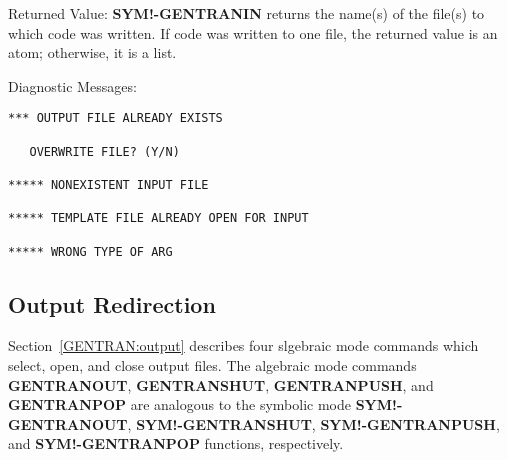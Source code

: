 \begin{describe}{Returned Value:}
{\bf SYM!-GENTRANIN} returns the name(s) of the file(s) to which code was
written.  If code was written to one file, the returned value is an atom;
otherwise, it is a list.
\end{describe} 
\begin{describe}{Diagnostic Messages:}
\begin{verbatim}
*** OUTPUT FILE ALREADY EXISTS

   OVERWRITE FILE? (Y/N)

***** NONEXISTENT INPUT FILE

***** TEMPLATE FILE ALREADY OPEN FOR INPUT

***** WRONG TYPE OF ARG
\end{verbatim}
\end{describe} 

\subsection{Output Redirection}
Section~\ref{GENTRAN:output} describes four slgebraic mode commands
which select, open, and close output files.  The algebraic mode commands
 
 
{\bf GENTRANOUT}, {\bf GENTRANSHUT}, {\bf GENTRANPUSH}, and {\bf
GENTRANPOP} are analogous to the symbolic mode {\bf
SYM!-GENTRANOUT}, {\bf SYM!-GENTRANSHUT}, {\bf SYM!-GENTRANPUSH}, and
{\bf SYM!-GENTRANPOP} functions, respectively.


